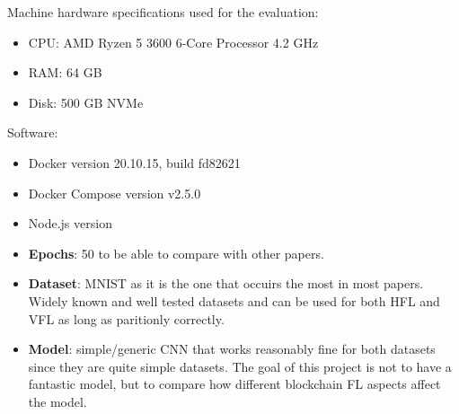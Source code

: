 
Machine hardware specifications used for the evaluation:

\begin{itemize}
    \item CPU: AMD Ryzen 5 3600 6-Core Processor 4.2 GHz
    \item RAM: 64 GB
    \item Disk: 500 GB NVMe
\end{itemize}

Software:

\begin{itemize}
    \item Docker version 20.10.15, build fd82621
    \item Docker Compose version v2.5.0
    \item Node.js version 
\end{itemize}

\begin{itemize}
    \item \textbf{Epochs}: 50 to be able to compare with other papers.
    
    \item \textbf{Dataset}: MNIST \cite{lecun2010mnist} as it is the one that occuirs the most in most papers. Widely known and well tested datasets and can be used for both HFL and VFL as long as paritionly correctly.
    
    \item \textbf{Model}: simple/generic CNN that works reasonably fine for both datasets since they are quite simple datasets. The goal of this project is not to have a fantastic model, but to compare how different blockchain FL aspects affect the model.
\end{itemize}

